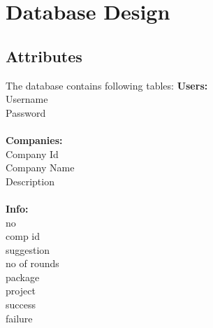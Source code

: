 \chapter{Database Design}
\thispagestyle{special}
\section{Attributes}
The database contains following tables:
\textbf{Users:}\\
     Username\\
  Password\\
\\
    \textbf{Companies:}\\
    Company Id\\
    Company Name\\
    Description\\
\\
    \textbf{Info:}\\
    no\\
    comp id\\
    suggestion\\
    no of rounds\\
    package\\
    project\\
    success\\
    failure \\
    \\
